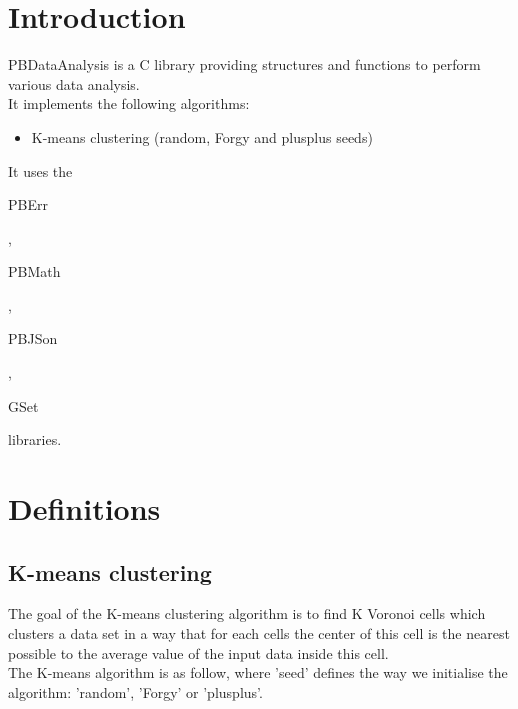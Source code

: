 \section*{Introduction}

PBDataAnalysis is a C library providing structures and functions to perform various data analysis.\\ 

It implements the following algorithms:
\begin{itemize}
\item K-means clustering (random, Forgy and plusplus seeds)
\end{itemize}

It uses the \begin{ttfamily}PBErr\end{ttfamily}, \begin{ttfamily}PBMath\end{ttfamily}, \begin{ttfamily}PBJSon\end{ttfamily}, \begin{ttfamily}GSet\end{ttfamily} libraries.\\

\section{Definitions}

\subsection{K-means clustering}

The goal of the K-means clustering algorithm is to find K Voronoi cells which clusters a data set in a way that for each cells the center of this cell is the nearest possible to the average value of the input data inside this cell.\\

The K-means algorithm is as follow, where 'seed' defines the way we initialise the algorithm: 'random', 'Forgy' or 'plusplus'.\\

\begin{scriptsize}
\begin{ttfamily}

\end{ttfamily}
\end{scriptsize}

